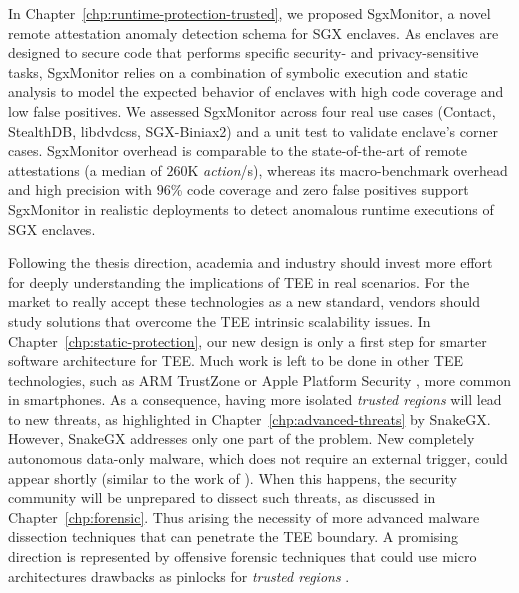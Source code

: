 In Chapter~\ref{chp:runtime-protection-trusted}, we proposed SgxMonitor, a 
novel remote attestation anomaly detection schema for SGX enclaves. As enclaves 
are designed to secure code that performs specific security- and 
privacy-sensitive tasks, SgxMonitor relies on a combination of symbolic 
execution and static analysis to model the expected behavior of enclaves with 
high code coverage and low false positives.  
We assessed SgxMonitor across four real use cases (\ie \textsf{Contact}, 
\textsf{StealthDB}, \textsf{libdvdcss}, \textsf{SGX-Biniax2}) and a 
\textsf{unit test} to validate enclave's corner cases. SgxMonitor overhead is 
comparable to the state-of-the-art of remote attestations (a median of $260$K
\emph{action}/s), whereas its macro-benchmark overhead and high precision
with $96$\% code coverage and zero false positives support SgxMonitor in 
realistic deployments to detect anomalous runtime executions of SGX enclaves.

\vspace{0.3cm}
Following the thesis direction, academia and industry should invest more 
effort for deeply understanding the implications of TEE in real scenarios.
For the market to really accept these technologies as a new standard, vendors 
should study solutions that overcome the TEE intrinsic scalability issues. 
In Chapter~\ref{chp:static-protection}, our new design is only a first step for 
smarter software architecture for TEE.
Much work is left to be done in other TEE technologies, such as ARM TrustZone 
\citep{arm-trustzone} or Apple Platform Security \citep{apple-enclave}, more 
common in smartphones.
As a consequence, having more isolated \emph{trusted regions} will lead to new 
threats, as highlighted in Chapter~\ref{chp:advanced-threats} by SnakeGX.
However, SnakeGX addresses only one part of the problem. 
New completely autonomous data-only malware, which does not require an external 
trigger, could appear shortly (similar to the work of 
\cite{vogl2014persistent}).
When this happens, the security community will be unprepared to dissect such 
threats, as discussed in Chapter~\ref{chp:forensic}.
Thus arising the necessity of more advanced malware dissection techniques that
can penetrate the TEE boundary. A promising direction is represented by 
offensive forensic techniques that could use micro 
architectures drawbacks as pinlocks for \emph{trusted regions} 
\citep{offensiveforensic}.

